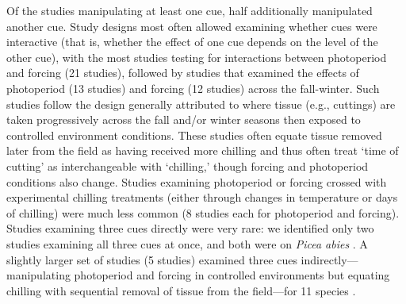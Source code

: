 \documentclass[11pt,letter]{article}
\begin{document}
Of the studies manipulating at least one cue, half additionally manipulated another cue. Study designs most often allowed examining whether cues were interactive (that is, whether the effect of one cue depends on the level of the other cue), with the most studies testing for interactions between photoperiod and forcing (21 studies), followed by studies that examined the effects of photoperiod (13 studies) and forcing (12 studies) across the fall-winter. Such studies follow the design generally attributed to \citet{weinberger1950} where tissue (e.g., cuttings) are taken progressively across the fall and/or winter seasons then exposed to controlled environment conditions. These studies often equate tissue removed later from the field as having received more chilling and thus often treat `time of cutting' as interchangeable with `chilling,' though forcing and photoperiod conditions also change. Studies examining photoperiod or forcing crossed with experimental chilling treatments (either through changes in temperature or days of chilling) were much less common (8 studies each for photoperiod and forcing). \\

Studies examining three cues directly were very rare: we identified only two studies examining all three cues at once, and both were on \emph{Picea abies} \citep{Worrall:1967aa,Sogaard:2008aa}. A slightly larger set of studies (5 studies) examined three cues indirectly---manipulating photoperiod and forcing in controlled environments but equating chilling with sequential removal of tissue from the field---for 11 species \citep{Schnabel:1987aa,Heide:1993,Partanen:1998aa,Basler:2014aa}. \\
\end{document}
